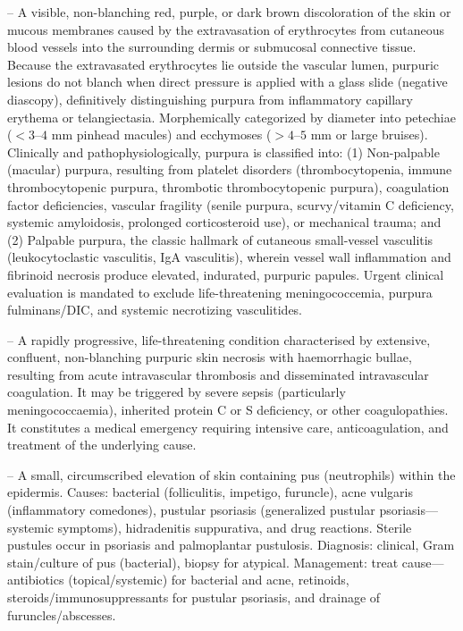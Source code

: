 -- A visible, non-blanching red, purple, or dark brown discoloration of the skin or mucous membranes caused by the extravasation of erythrocytes from cutaneous blood vessels into the surrounding dermis or submucosal connective tissue. Because the extravasated erythrocytes lie outside the vascular lumen, purpuric lesions do not blanch when direct pressure is applied with a glass slide (negative diascopy), definitively distinguishing purpura from inflammatory capillary erythema or telangiectasia. Morphemically categorized by diameter into petechiae ($<3\text{--}4\text{ mm}$ pinhead macules) and ecchymoses ($>4\text{--}5\text{ mm}$ or large bruises). Clinically and pathophysiologically, purpura is classified into: (1) Non-palpable (macular) purpura, resulting from platelet disorders (thrombocytopenia, immune thrombocytopenic purpura, thrombotic thrombocytopenic purpura), coagulation factor deficiencies, vascular fragility (senile purpura, scurvy/vitamin C deficiency, systemic amyloidosis, prolonged corticosteroid use), or mechanical trauma; and (2) Palpable purpura, the classic hallmark of cutaneous small-vessel vasculitis (leukocytoclastic vasculitis, IgA vasculitis), wherein vessel wall inflammation and fibrinoid necrosis produce elevated, indurated, purpuric papules. Urgent clinical evaluation is mandated to exclude life-threatening meningococcemia, purpura fulminans/DIC, and systemic necrotizing vasculitides.

-- A rapidly progressive, life-threatening condition characterised by extensive, confluent, non-blanching purpuric skin necrosis with haemorrhagic bullae, resulting from acute intravascular thrombosis and disseminated intravascular coagulation. It may be triggered by severe sepsis (particularly meningococcaemia), inherited protein C or S deficiency, or other coagulopathies. It constitutes a medical emergency requiring intensive care, anticoagulation, and treatment of the underlying cause.

-- A small, circumscribed elevation of skin containing pus (neutrophils) within the epidermis. Causes: bacterial (folliculitis, impetigo, furuncle), acne vulgaris (inflammatory comedones), pustular psoriasis (generalized pustular psoriasis—systemic symptoms), hidradenitis suppurativa, and drug reactions. Sterile pustules occur in psoriasis and palmoplantar pustulosis. Diagnosis: clinical, Gram stain/culture of pus (bacterial), biopsy for atypical. Management: treat cause—antibiotics (topical/systemic) for bacterial and acne, retinoids, steroids/immunosuppressants for pustular psoriasis, and drainage of furuncles/abscesses.

